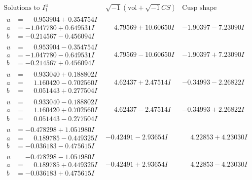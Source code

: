 \documentclass[1p]{elsarticle_modified}
\theoremstyle{definition}
\newcommand{\I}{\sqrt{-1}}
\begin{document}
$$\begin{array}{c|c|c}  
\text{Solutions to }I^u_{1}& \I (\text{vol} + \sqrt{-1}CS) & \text{Cusp shape}\\
 \hline 
\begin{aligned}
u &= \phantom{-}0.953904 + 0.354754 I \\
a &= -1.047780 + 0.649531 I \\
b &= -0.214567 - 0.456094 I\end{aligned}
 & \phantom{-}4.79569 + 10.60650 I & -1.90397 - 7.23090 I \\ \hline\begin{aligned}
u &= \phantom{-}0.953904 - 0.354754 I \\
a &= -1.047780 - 0.649531 I \\
b &= -0.214567 + 0.456094 I\end{aligned}
 & \phantom{-}4.79569 - 10.60650 I & -1.90397 + 7.23090 I \\ \hline\begin{aligned}
u &= \phantom{-}0.933040 + 0.188802 I \\
a &= \phantom{-}1.160420 - 0.702560 I \\
b &= \phantom{-}0.051443 + 0.277504 I\end{aligned}
 & \phantom{-}4.62437 + 2.47514 I & -0.34993 - 2.26822 I \\ \hline\begin{aligned}
u &= \phantom{-}0.933040 - 0.188802 I \\
a &= \phantom{-}1.160420 + 0.702560 I \\
b &= \phantom{-}0.051443 - 0.277504 I\end{aligned}
 & \phantom{-}4.62437 - 2.47514 I & -0.34993 + 2.26822 I \\ \hline\begin{aligned}
u &= -0.478298 + 1.051980 I \\
a &= \phantom{-}0.189785 - 0.449325 I \\
b &= -0.036183 - 0.475615 I\end{aligned}
 & -0.42491 - 2.93654 I & \phantom{-}4.22853 + 4.23030 I \\ \hline\begin{aligned}
u &= -0.478298 - 1.051980 I \\
a &= \phantom{-}0.189785 + 0.449325 I \\
b &= -0.036183 + 0.475615 I\end{aligned}
 & -0.42491 + 2.93654 I & \phantom{-}4.22853 - 4.23030 I \\ \hline\begin{aligned}

\end{aligned}
\end{array}$$
\end{document}

